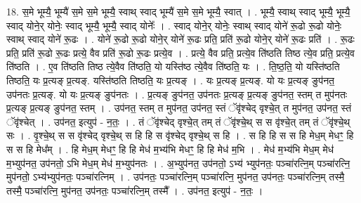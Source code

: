 \documentclass[17pt]{extarticle}
\begin{document}
18. स॒मे भूम्यै॒ भूम्यै॑ स॒मे स॒मे भूम्यै॒ स्वाथ् स्वाद् भूम्यै॑ स॒मे स॒मे भूम्यै॒ स्वात् । . भूम्यै॒ स्वाथ् स्वाद् भूम्यै॒ भूम्यै॒ स्वाद् योने॒र् योनेः॒ स्वाद् भूम्यै॒ भूम्यै॒ स्वाद् योनेः᳚ । . स्वाद् योने॒र् योनेः॒ स्वाथ् स्वाद् योने॑ रू॒ढो रू॒ढो योनेः॒ स्वाथ् स्वाद् योने॑ रू॒ढः । . योने॑ रू॒ढो रू॒ढो योने॒र् योने॑ रू॒ढः प्रति॒ प्रति॑ रू॒ढो योने॒र् योने॑ रू॒ढः प्रति॑ । . रू॒ढः प्रति॒ प्रति॑ रू॒ढो रू॒ढः प्रत्ये॒ वैव प्रति॑ रू॒ढो रू॒ढः प्रत्ये॒व । . प्रत्ये॒ वैव प्रति॒ प्रत्ये॒व ति॑ष्ठति तिष्ठ त्ये॒व प्रति॒ प्रत्ये॒व ति॑ष्ठति । . ए॒व ति॑ष्ठति तिष्ठ त्ये॒वैव ति॑ष्ठति॒ यो यस्ति॑ष्ठ त्ये॒वैव ति॑ष्ठति॒ यः । . ति॒ष्ठ॒ति॒ यो यस्ति॑ष्ठति तिष्ठति॒ यः प्र॒त्यङ् प्र॒त्यङ्. यस्ति॑ष्ठति तिष्ठति॒ यः प्र॒त्यङ् । . यः प्र॒त्यङ् प्र॒त्यङ्. यो यः प्र॒त्यङ् ङुप॑नत॒ उप॑नतः प्र॒त्यङ्. यो यः प्र॒त्यङ् ङुप॑नतः । . प्र॒त्यङ् ङुप॑नत॒ उप॑नतः प्र॒त्यङ् प्र॒त्यङ् ङुप॑नत॒ स्तम् त मुप॑नतः प्र॒त्यङ् प्र॒त्यङ् 
ङुप॑नत॒ स्तम् । . उप॑नत॒ स्तम् त मुप॑नत॒ उप॑नत॒ स्तं ॅवृ॑श्चेद् वृश्चे॒त् त मुप॑नत॒ उप॑नत॒ स्तं ॅवृ॑श्चेत् । . उप॑नत॒ इत्युप॑ - न॒तः॒ । . तं ॅवृ॑श्चेद् वृश्चे॒त् तम् तं ॅवृ॑श्चे॒थ् स स वृ॑श्चे॒त् तम् तं ॅवृ॑श्चे॒थ् सः । . वृ॒श्चे॒थ् स स वृ॑श्चेद् वृश्चे॒थ् स हि हि स वृ॑श्चेद् वृश्चे॒थ् स हि । . स हि हि स स हि मेध॒म् मेधꣳ॒॒ हि स स हि मेध᳚म् । . हि मेध॒म् मेधꣳ॒॒ हि हि मेध॑ म॒भ्य॑भि मेधꣳ॒॒ हि हि मेध॑ म॒भि । . मेध॑ म॒भ्य॑भि मेध॒म् मेध॑ म॒भ्युप॑नत॒ उप॑नतो॒ ऽभि मेध॒म् मेध॑ म॒भ्युप॑नतः । . अ॒भ्युप॑नत॒ उप॑नतो॒ ऽभ्य॑ भ्युप॑नतः॒ पञ्चा॑रत्नि॒म् पञ्चा॑रत्नि॒ मुप॑नतो॒ ऽभ्य॑भ्युप॑नतः॒ पञ्चा॑रत्निम् । . उप॑नतः॒ पञ्चा॑रत्नि॒म् पञ्चा॑रत्नि॒ मुप॑नत॒ उप॑नतः॒ पञ्चा॑रत्नि॒म् तस्मै॒ तस्मै॒ पञ्चा॑रत्नि॒ मुप॑नत॒ उप॑नतः॒ पञ्चा॑रत्नि॒म् तस्मै᳚ । . उप॑नत॒ इत्युप॑ - न॒तः॒ । \newline
\end{document}
